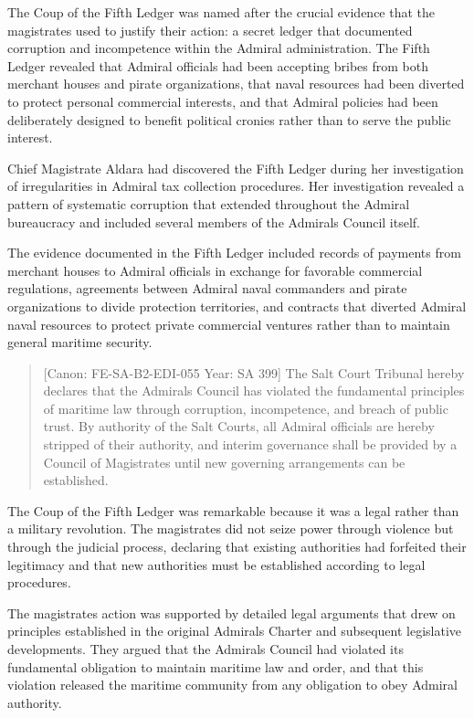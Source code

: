 The Coup of the Fifth Ledger was named after the crucial evidence that
the magistrates used to justify their action: a secret ledger that
documented corruption and incompetence within the Admiral
administration. The Fifth Ledger revealed that Admiral officials had
been accepting bribes from both merchant houses and pirate
organizations, that naval resources had been diverted to protect
personal commercial interests, and that Admiral policies had been
deliberately designed to benefit political cronies rather than to serve
the public interest.

Chief Magistrate Aldara had discovered the Fifth Ledger during her
investigation of irregularities in Admiral tax collection procedures.
Her investigation revealed a pattern of systematic corruption that
extended throughout the Admiral bureaucracy and included several members
of the Admiral\textquotesingle s Council itself.

The evidence documented in the Fifth Ledger included records of payments
from merchant houses to Admiral officials in exchange for favorable
commercial regulations, agreements between Admiral naval commanders and
pirate organizations to divide protection territories, and contracts
that diverted Admiral naval resources to protect private commercial
ventures rather than to maintain general maritime security.

\begin{quote}
{[}Canon: FE-SA-B2-EDI-055 \textbar{} Year: SA 399{]} The Salt Court
Tribunal hereby declares that the Admiral\textquotesingle s Council has
violated the fundamental principles of maritime law through corruption,
incompetence, and breach of public trust. By authority of the Salt
Courts, all Admiral officials are hereby stripped of their authority,
and interim governance shall be provided by a Council of Magistrates
until new governing arrangements can be established.
\end{quote}

The Coup of the Fifth Ledger was remarkable because it was a legal
rather than a military revolution. The magistrates did not seize power
through violence but through the judicial process, declaring that
existing authorities had forfeited their legitimacy and that new
authorities must be established according to legal procedures.

The magistrates\textquotesingle{} action was supported by detailed legal
arguments that drew on principles established in the original
Admiral\textquotesingle s Charter and subsequent legislative
developments. They argued that the Admiral\textquotesingle s Council had
violated its fundamental obligation to maintain maritime law and order,
and that this violation released the maritime community from any
obligation to obey Admiral authority.


